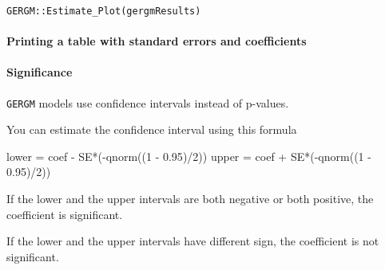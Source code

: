 \documentclass[
]{article}
\newenvironment{Shaded}{\begin{snugshade}}{\end{snugshade}}
\newcommand{\DecValTok}[1]{\textcolor[rgb]{0.00,0.00,0.81}{#1}}
\newcommand{\FloatTok}[1]{\textcolor[rgb]{0.00,0.00,0.81}{#1}}
\newcommand{\FunctionTok}[1]{\textcolor[rgb]{0.00,0.00,0.00}{#1}}
\newcommand{\NormalTok}[1]{#1}
\newcommand{\OtherTok}[1]{\textcolor[rgb]{0.56,0.35,0.01}{#1}}
\newcommand{\SpecialCharTok}[1]{\textcolor[rgb]{0.00,0.00,0.00}{#1}}
\begin{document}
\texttt{GERGM::Estimate\_Plot(gergmResults)}

\hypertarget{printing-a-table-with-standard-errors-and-coefficients}{%
\paragraph{Printing a table with standard errors and
coefficients}\label{printing-a-table-with-standard-errors-and-coefficients}}

\begin{Shaded}
\end{Shaded}

\hypertarget{significance}{%
\paragraph{Significance}\label{significance}}

\texttt{GERGM} models use confidence intervals instead of p-values.

You can estimate the confidence interval using this formula

\begin{Shaded}
\begin{Highlighting}[]
\NormalTok{lower }\OtherTok{=}\NormalTok{ coef }\SpecialCharTok{{-}}\NormalTok{ SE}\SpecialCharTok{*}\NormalTok{(}\SpecialCharTok{{-}}\FunctionTok{qnorm}\NormalTok{((}\DecValTok{1} \SpecialCharTok{{-}} \FloatTok{0.95}\NormalTok{)}\SpecialCharTok{/}\DecValTok{2}\NormalTok{))}
\NormalTok{upper }\OtherTok{=}\NormalTok{ coef }\SpecialCharTok{+}\NormalTok{ SE}\SpecialCharTok{*}\NormalTok{(}\SpecialCharTok{{-}}\FunctionTok{qnorm}\NormalTok{((}\DecValTok{1} \SpecialCharTok{{-}} \FloatTok{0.95}\NormalTok{)}\SpecialCharTok{/}\DecValTok{2}\NormalTok{))}
\end{Highlighting}
\end{Shaded}

If the lower and the upper intervals are both negative or both positive,
the coefficient is significant.

If the lower and the upper intervals have different sign, the
coefficient is not significant.
\end{document}

